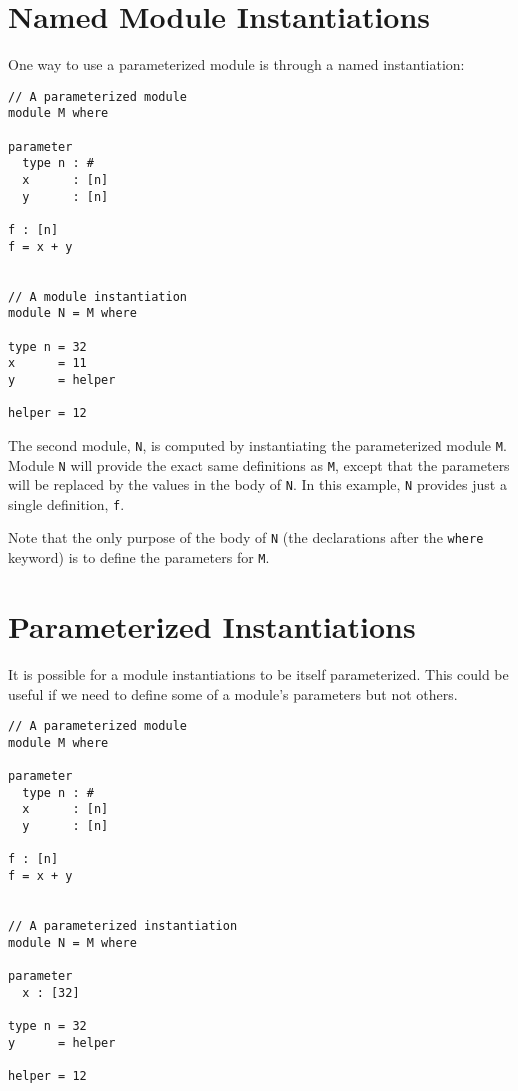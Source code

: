 \section{Named Module Instantiations}\label{named-module-instantiations}

One way to use a parameterized module is through a named instantiation:

\begin{verbatim}
// A parameterized module
module M where

parameter
  type n : #
  x      : [n]
  y      : [n]

f : [n]
f = x + y


// A module instantiation
module N = M where

type n = 32
x      = 11
y      = helper

helper = 12
\end{verbatim}

The second module, \texttt{N}, is computed by instantiating the
parameterized module \texttt{M}. Module \texttt{N} will provide the
exact same definitions as \texttt{M}, except that the parameters will be
replaced by the values in the body of \texttt{N}. In this example,
\texttt{N} provides just a single definition, \texttt{f}.

Note that the only purpose of the body of \texttt{N} (the declarations
after the \texttt{where} keyword) is to define the parameters for
\texttt{M}.

\section{Parameterized
Instantiations}\label{parameterized-instantiations}

It is possible for a module instantiations to be itself parameterized.
This could be useful if we need to define some of a module's parameters
but not others.

\begin{verbatim}
// A parameterized module
module M where

parameter
  type n : #
  x      : [n]
  y      : [n]

f : [n]
f = x + y


// A parameterized instantiation
module N = M where

parameter
  x : [32]

type n = 32
y      = helper

helper = 12
\end{verbatim}

